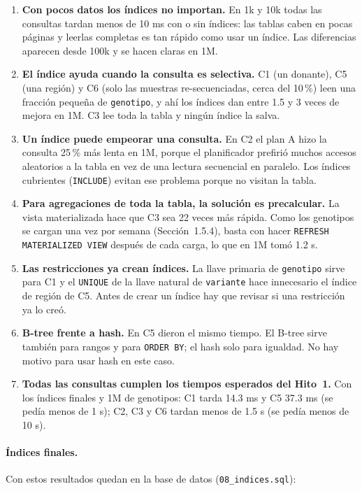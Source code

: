 \begin{enumerate}
  \item \textbf{Con pocos datos los índices no importan.} En 1k y 10k todas las consultas tardan menos de
        10 ms con o sin índices: las tablas caben en pocas páginas y leerlas completas es tan rápido como usar un
        índice. Las diferencias aparecen desde 100k y se hacen claras en 1M.
  \item \textbf{El índice ayuda cuando la consulta es selectiva.} C1 (un donante), C5 (una región) y C6 (solo las
        muestras re-secuenciadas, cerca del 10\,\%) leen una fracción pequeña de \texttt{genotipo}, y ahí los
        índices dan entre 1.5 y 3 veces de mejora en 1M. C3 lee toda la tabla y ningún índice la salva.
  \item \textbf{Un índice puede empeorar una consulta.} En C2 el plan A hizo la consulta 25\,\% más lenta en 1M,
        porque el planificador prefirió muchos accesos aleatorios a la tabla en vez de una lectura secuencial en
        paralelo. Los índices cubrientes (\texttt{INCLUDE}) evitan ese problema porque no visitan la tabla.
  \item \textbf{Para agregaciones de toda la tabla, la solución es precalcular.} La vista materializada hace que C3
        sea 22 veces más rápida. Como los genotipos se cargan una vez por semana
        (Sección~1.5.4), basta con hacer \texttt{REFRESH MATERIALIZED VIEW} después de cada carga, lo que en 1M
        tomó 1.2 s.
  \item \textbf{Las restricciones ya crean índices.} La llave primaria de \texttt{genotipo} sirve para C1 y el
        \texttt{UNIQUE} de la llave natural de \texttt{variante} hace innecesario el índice de región de C5. Antes de
        crear un índice hay que revisar si una restricción ya lo creó.
  \item \textbf{B-tree frente a hash.} En C5 dieron el mismo tiempo. El B-tree sirve también para rangos y para
        \texttt{ORDER BY}; el hash solo para igualdad. No hay motivo para usar hash en este caso.
  \item \textbf{Todas las consultas cumplen los tiempos esperados del Hito~1.} Con los índices finales y 1M de
        genotipos: C1 tarda 14.3 ms y C5 37.3 ms (se pedía menos de 1 s); C2, C3 y C6 tardan
        menos de 1.5 s (se pedía menos de 10 s).
\end{enumerate}

\paragraph{Índices finales.} Con estos resultados quedan en la base de datos (\texttt{08\_\allowbreak{}indices.sql}):

